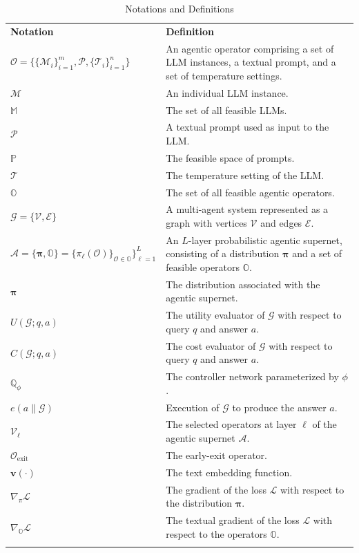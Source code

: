 \documentclass{article}
\theoremstyle{plain}
\theoremstyle{definition}
\theoremstyle{remark}
\begin{document}
\begin{table}[!h]
\centering
\caption{Notations and Definitions}
\begin{tabular}{lp{12cm}}
\Xhline{1.2pt}
\textbf{Notation} & \textbf{Definition} \\ 
\Xhline{1.pt}
$\mathcal{O} = \{\{\mathcal{M}_i\}_{i=1}^m, \mathcal{P}, \{\mathcal{T}_i\}_{i=1}^n\}$ & An agentic operator comprising a set of LLM instances, a textual prompt, and a set of temperature settings. \\ 
$\mathcal{M}$ & An individual LLM instance. \\ 
$\mathbb{M}$ & The set of all feasible LLMs. \\ 
$\mathcal{P}$ & A textual prompt used as input to the LLM. \\ 
$\mathbb{P}$ & The feasible space of prompts. \\ 
$\mathcal{T}$ & The temperature setting of the LLM. \\ 
$\mathbb{O}$ & The set of all feasible agentic operators. \\ 
$\mathcal{G} = \{\mathcal{V},\mathcal{E}\}$ & A multi-agent system represented as a graph with vertices $\mathcal{V}$ and edges $\mathcal{E}$. \\ 
$\mathcal{A} = \{\boldsymbol{\pi}, \mathbb{O}\} = \{\pi_{\ell}(\mathcal{O})\}_{\mathcal{O} \in \mathbb{O}}\}_{\ell=1}^L$ & An $L$-layer probabilistic agentic supernet, consisting of a distribution $\boldsymbol{\pi}$ and a set of feasible operators $\mathbb{O}$. \\ 
$\boldsymbol{\pi}$ & The distribution associated with the agentic supernet. \\ 
$U(\mathcal{G}; q,a)$ & The utility evaluator of $\mathcal{G}$ with respect to query $q$ and answer $a$. \\ 
$C(\mathcal{G}; q,a)$ & The cost evaluator of $\mathcal{G}$ with respect to query $q$ and answer $a$. \\ 
$\mathbb{Q}_\phi$ & The controller network parameterized by $\phi$. \\ 
$e(a\|\mathcal{G})$ & Execution of $\mathcal{G}$ to produce the answer $a$. \\ 
$\mathcal{V}_\ell$ & The selected operators at layer $\ell$ of the agentic supernet $\mathcal{A}$. \\ 
$\mathcal{O}_\text{exit}$ & The early-exit operator. \\ 
$\mathbf{v}(\cdot)$ & The text embedding function. \\ 
$\nabla_\pi\mathcal{L}$ & The gradient of the loss $\mathcal{L}$ with respect to the distribution $\boldsymbol{\pi}$. \\ 
$\nabla_\mathbb{O}\mathcal{L}$ & The textual gradient of the loss $\mathcal{L}$ with respect to the operators $\mathbb{O}$. \\ 
\Xhline{1.2pt}
\end{tabular}
\label{tab:notations}
\end{table}
\end{document}
